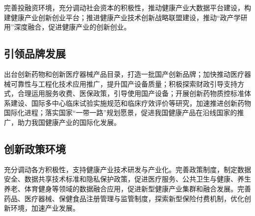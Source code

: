 \documentclass{article}
\begin{document}
完善投融资环境，充分调动社会资本的积极性，推动健康产业大数据平台建设，构建健康产业创新创业平台；推进健康产业技术创新战略联盟建设，推动“政产学研用”深度融合，促进健康产业的创新创业。

\subsection{引领品牌发展}

出台创新药物和创新医疗器械产品目录，打造一批国产创新品牌；加快推动医疗器械可靠性与工程化技术应用推广，提升国产设备质量；积极探索财政引导支持方式，合理运用服务收费、医保政策，引导使用国产设备；开展创新药物质控标准体系建设、国际多中心临床试验实施规范和临床疗效评价等研究，加速推进创新药物国际化进程；落实国家“一带一路”规划愿景，促进我国健康产品在沿线国家的推广，助力我国健康产业的国际化发展。

\subsection{创新政策环境}

充分调动各方积极性，支持健康产业技术研发与产业化。完善政策制度，制定数据安全、数据共享技术标准和隐私保护政策，促进医疗服务、公共卫生与健康、养生养老、体育健身等领域的数据融合应用，促进新型健康产业集群和融合发展。完善药品、医疗器械、保健食品注册管理与监管制度，探索新型保险付费机制，优化创新环境，加速产业发展。
\end{document}

